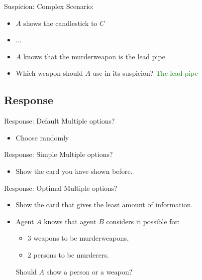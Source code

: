 
\begin{frame}{Suspicion: Complex}
  Scenario:
  \begin{itemize}
    \item $A$ shows the candlestick to $C$ 
    \item ...
    \item $A$ knows that the murderweapon is the lead pipe.
    \item Which weapon should $A$ use in its suspicion? \textcolor{green}{The lead pipe}
  \end{itemize}
\end{frame}


\subsection{Response}
\begin{frame}{Response: Default}
Multiple options?
  \begin{itemize}
  \item Choose randomly
  \end{itemize}
\end{frame}

\begin{frame}{Response: Simple}
Multiple options?
  \begin{itemize}
  \item Show the card you have shown before.
  \end{itemize}
\end{frame}

\begin{frame}{Response: Optimal}
Multiple options?
  \begin{itemize}
  \item Show the card that gives the least amount of information.
  \item Agent $A$ knows that agent $B$ considers it possible for:
  \begin{itemize}
    \item 3 weapons to be murderweapons.
    \item 2 persons to be murderers. 
  \end{itemize}
  Should $A$ show a person or a weapon?
  \end{itemize}
\end{frame}

